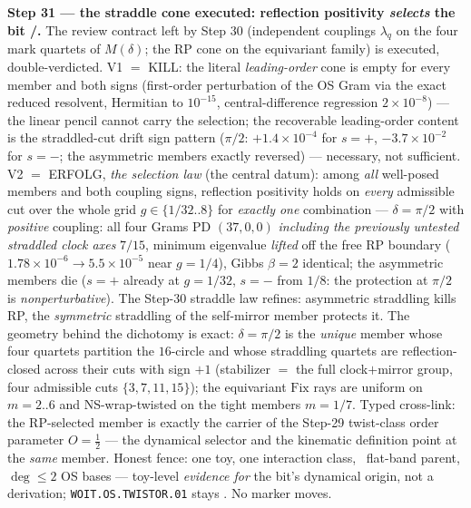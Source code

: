 \par\smallskip\noindent\textbf{Step 31 --- the straddle cone executed: reflection positivity
\emph{selects} the bit \mE/\mC.} The review contract left by Step 30 (independent couplings
$\lambda_q$ on the four mark quartets of $M(\delta)$; the RP cone on the equivariant family) is
executed, double-verdicted. V1 $=$ KILL: the literal \emph{leading-order} cone is empty for every
member and both signs (first-order perturbation of the OS Gram via the exact reduced resolvent,
Hermitian to $10^{-15}$, central-difference regression $2\times10^{-8}$) --- the linear pencil
cannot carry the selection; the recoverable leading-order content is the straddled-cut drift sign
pattern ($\pi/2$: $+1.4\times10^{-4}$ for $s{=}+$, $-3.7\times10^{-2}$ for $s{=}-$; the asymmetric
members exactly reversed) --- necessary, not sufficient. V2 $=$ ERFOLG, \emph{the selection law}
(the central datum): among \emph{all} well-posed members and both coupling signs, reflection
positivity holds on \emph{every} admissible cut over the whole grid $g\in\{1/32..8\}$ for
\emph{exactly one} combination --- $\delta=\pi/2$ with \emph{positive} coupling: all four Grams PD
$(37,0,0)$ \emph{including the previously untested straddled clock axes} $7/15$, minimum
eigenvalue \emph{lifted} off the free RP boundary ($1.78\times10^{-6}\to5.5\times10^{-5}$ near
$g=1/4$), Gibbs $\beta=2$ identical; the asymmetric members die ($s{=}+$ already at $g=1/32$,
$s{=}-$ from $1/8$: the protection at $\pi/2$ is \emph{nonperturbative}). The Step-30 straddle law
refines: asymmetric straddling kills RP, the \emph{symmetric} straddling of the self-mirror member
protects it. The geometry behind the dichotomy is exact: $\delta=\pi/2$ is the \emph{unique}
member whose four quartets partition the $16$-circle and whose straddling quartets are
reflection-closed across their cuts with sign $+1$ (stabilizer $=$ the full clock$+$mirror group,
four admissible cuts $\{3,7,11,15\}$); the equivariant $\mathrm{Fix}$ rays are uniform on
$m=2..6$ and NS-wrap-twisted on the tight members $m=1/7$. Typed cross-link: the RP-selected
member is exactly the carrier of the Step-29 twist-class order parameter $O=\tfrac12$ --- the
dynamical selector and the kinematic definition point at the \emph{same} member. Honest fence:
one toy, one interaction class, \mC\ flat-band parent, $\deg\le2$ OS bases --- toy-level
\emph{evidence for} the bit's dynamical origin, not a derivation; \texttt{WOIT.OS.TWISTOR.01}
stays \mO. No marker moves.

